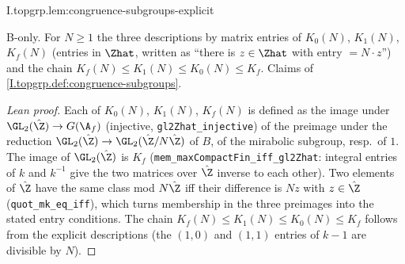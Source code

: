 \begin{lemma}
\bonly
{}
\end{lemma}
\begin{tfformal}{I.topgrp.lem:congruence-subgroups-explicit}
\begin{tffidelity}
B-only. For $N\ge1$ the three descriptions by matrix entries of $K_0(N)$, $K_1(N)$, $K_f(N)$ (entries in $\Zhat$, written as ``there is $z\in\Zhat$ with entry $=N\cdot z$'') and the chain $K_f(N)\le K_1(N)\le K_0(N)\le K_f$. Claims of \cref{I.topgrp.def:congruence-subgroups}.
\end{tffidelity}
\end{tfformal}
\begin{proof}[Lean proof]
Each of $K_0(N)$, $K_1(N)$, $K_f(N)$ is defined as the image under $\GL_2(\hat\Z)\to G(\A_f)$ (injective, \texttt{gl2Zhat\_injective}) of the preimage under the reduction $\GL_2(\hat\Z)\to\GL_2(\hat\Z/N\hat\Z)$ of $B$, of the mirabolic subgroup, resp.\ of $1$. The image of $\GL_2(\hat\Z)$ is $K_f$ (\texttt{mem\_maxCompactFin\_iff\_gl2Zhat}: integral entries of $k$ and $k^{-1}$ give the two matrices over $\hat\Z$ inverse to each other). Two elements of $\hat\Z$ have the same class mod $N\hat\Z$ iff their difference is $Nz$ with $z\in\hat\Z$ (\texttt{quot\_mk\_eq\_iff}), which turns membership in the three preimages into the stated entry conditions. The chain $K_f(N)\le K_1(N)\le K_0(N)\le K_f$ follows from the explicit descriptions (the $(1,0)$ and $(1,1)$ entries of $k-1$ are divisible by $N$).
\end{proof}
